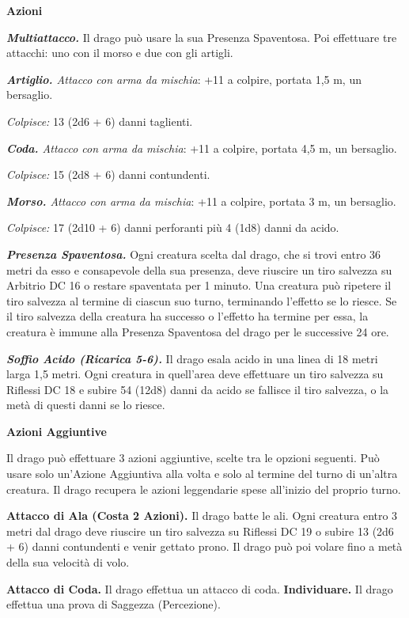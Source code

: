 \begin{multicols}{2}
\textbf{Azioni}

\emph{\textbf{Multiattacco.}} Il drago può usare la sua Presenza
Spaventosa. Poi effettuare tre attacchi: uno con il morso e due con gli
artigli.

\emph{\textbf{Artiglio.} Attacco con arma da mischia}: +11 a colpire,
portata 1,5 m, un bersaglio.

\emph{Colpisce:} 13 (2d6 + 6) danni taglienti.

\emph{\textbf{Coda.} Attacco con arma da mischia}: +11 a colpire,
portata 4,5 m, un bersaglio.

\emph{Colpisce:} 15 (2d8 + 6) danni contundenti.

\emph{\textbf{Morso.} Attacco con arma da mischia}: +11 a colpire,
portata 3 m, un bersaglio.

\emph{Colpisce:} 17 (2d10 + 6) danni perforanti più 4 (1d8) danni da
acido.

\emph{\textbf{Presenza Spaventosa.}} Ogni creatura scelta dal drago, che
si trovi entro 36 metri da esso e consapevole della sua presenza, deve
riuscire un tiro salvezza su Arbitrio DC 16 o restare spaventata per 1
minuto. Una creatura può ripetere il tiro salvezza al termine di ciascun
suo turno, terminando l'effetto se lo riesce. Se il tiro salvezza della
creatura ha successo o l'effetto ha termine per essa, la creatura è
immune alla Presenza Spaventosa del drago per le successive 24 ore.

\emph{\textbf{Soffio Acido (Ricarica 5-6).}} Il drago esala acido in una
linea di 18 metri larga 1,5 metri. Ogni creatura in quell'area deve
effettuare un tiro salvezza su Riflessi DC 18 e subire 54 (12d8) danni
da acido se fallisce il tiro salvezza, o la metà di questi danni se lo
riesce.

\textbf{Azioni Aggiuntive}

Il drago può effettuare 3 azioni aggiuntive, scelte tra le opzioni
seguenti. Può usare solo un'Azione Aggiuntiva alla volta e solo al
termine del turno di un'altra creatura. Il drago recupera le azioni
leggendarie spese all'inizio del proprio turno.

\textbf{Attacco di Ala (Costa 2 Azioni).} Il drago batte le ali. Ogni
creatura entro 3 metri dal drago deve riuscire un tiro salvezza su Riflessi DC 19 o subire 13 (2d6 + 6) danni contundenti e venir gettato
prono. Il drago può poi volare fino a metà della sua velocità di volo.

\textbf{Attacco di Coda.} Il drago effettua un attacco di coda.
\textbf{Individuare.} Il drago effettua una prova di Saggezza
(Percezione).


\end{multicols}
